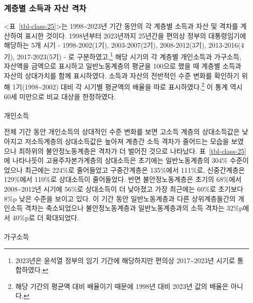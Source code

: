 \documentclass[
  letterpaper,
  DIV=11,
  numbers=noendperiod]{scrartcl}
\makeatletter
\let\oldparagraph\paragraph
\renewcommand{\paragraph}{
    \@ifstar
      \xxxParagraphStar
      \xxxParagraphNoStar
  }
\newcommand{\xxxParagraphStar}[1]{\oldparagraph*{#1}\mbox{}}
\newcommand{\xxxParagraphNoStar}[1]{\oldparagraph{#1}\mbox{}}
\makeatother
\begin{document}
\subsubsection{계층별 소득과 자산
격차}\label{uxacc4uxce35uxbcc4-uxc18cuxb4dduxacfc-uxc790uxc0b0-uxaca9uxcc28}

\textless{}표~\ref{tbl-class-25}\textgreater 는
1998\textasciitilde2023년 기간 동안의 각 계층별 소득과 자산 및 격차를
계산하여 표시한 것이다. 1998년부터 2023년까지 25년간을 편의상 정부의
대통령임기에 해당하는 5개 시기 - 1998-2002(1기), 2003-2007(2기),
2008-2012(3기), 2013-2016(4기), 2017-2023(5기) - 로
구분하였고,\footnote{2023년은 윤석열 정부의 임기 기간에 해당하지만
  편의상 2017\textasciitilde2023년 시기로 통합하였다.} 해당 시기의 각
계층별 개인소득과 가구소득, 자산액을 금액으로 표시하고 일반노동계층의
평균을 100으로 했을 때 계층별 소득과 자산의 상대가치를 함께 표시하였다.
소득과 자산의 전반적인 수준 변화를 확인하기 위해
1기(1998\textasciitilde2002) 대비 각 시기별 평균액의 배율을 따로
표시하였다.\footnote{해당 기간의 평균액 대비 배율이기 때문에 1998년 대비
  2023년 값의 배율은 아니다.} 이 통계 역시 60세 미만으로 비교 대상을
한정하였다.

\paragraph{개인소득}\label{uxac1cuxc778uxc18cuxb4dd}

전체 기간 동안 개인소득의 상대적인 수준 변화를 보면 고소득 계층의
상대소득값은 낮아지고 저소득계층의 상대소득값은 높아져 계층간 소득
격차가 줄어드는 모습을 보였으나 최하위의 불안정노동계층은 격차가 더
벌어진 것으로 나타났다. 표~\ref{tbl-class-25} 에 나타나듯이
고용주자본가계층의 상대소득은 초기에는 일반노동계층의 304\% 수준이었으나
최근에는 224\%로 줄어들었고 구중간계층은 135\%에서 111\%로, 신중간계층은
129\%에서 110\%로 상대소득이 줄어들었다. 반면 불안정노동계층은 초기의
68\%에서 2008\textasciitilde2012년 시기에 56\%로 상대소득이 더 낮아졌고
가장 최근에는 60\%로 초기보다 8\%p 낮은 수준을 보이고 있다. 이 기간 동안
일반노동계층과 다른 상위계층들간의 개인소득 격차는 축소되었으나
불안정노동계층과 일반노동계층과의 소득 격차는 32\%p에서 40\%p로 더
확대되었다.

\paragraph{가구소득}\label{uxac00uxad6cuxc18cuxb4dd}
\end{document}
